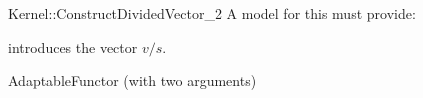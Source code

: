 \begin{ccRefFunctionObjectConcept}{Kernel::ConstructDividedVector_2}
A model for this must provide:


            {introduces the vector $v/s$.}


\ccRefines
AdaptableFunctor (with two arguments)

\ccSeeAlso
{}\\

\end{ccRefFunctionObjectConcept}
